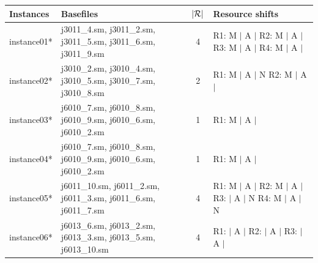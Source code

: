 \begin{table}[p]
    \centering
    \begin{tabularx}{0.95\textwidth}{lXcX}
        \toprule
        \textbf{Instances} & \textbf{Basefiles} & $|\mathcal{R}|$ & \textbf{Resource shifts} \\
        \midrule
        instance01* & j3011\_4.sm, j3011\_2.sm, j3011\_5.sm, j3011\_6.sm, j3011\_9.sm
                    & 4 
                    & R1: M $|$ A $|$  \newline
                      R2: M $|$ A $|$  \newline
                      R3: M $|$ A $|$  \newline
                      R4: M $|$ A $|$
                    \\
                    \cmidrule[0.01em](lr){1-4}
        instance02* & j3010\_2.sm, j3010\_4.sm, j3010\_5.sm, j3010\_7.sm, j3010\_8.sm
                    & 2 
                    & R1: M $|$ A $|$ N \newline
                      R2: M $|$ A $|$
                    \\
                    \cmidrule[0.01em](lr){1-4}
        instance03* & j6010\_7.sm, j6010\_8.sm, j6010\_9.sm, j6010\_6.sm, j6010\_2.sm 
                    & 1 
                    & R1: M $|$ A $|$ 
                    \\
                    \cmidrule[0.01em](lr){1-4}
        instance04* & j6010\_7.sm, j6010\_8.sm, j6010\_9.sm, j6010\_6.sm, j6010\_2.sm
                    & 1 
                    & R1: M $|$ A $|$
                    \\
                    \cmidrule[0.01em](lr){1-4}
        instance05* & j6011\_10.sm, j6011\_2.sm, j6011\_3.sm, j6011\_6.sm, j6011\_7.sm
                    & 4 
                    & R1: M $|$ A $|$ \newline
                      R2: M $|$ A $|$ \newline
                      R3: \phantom{M} $|$ A $|$ N \newline
                      R4: M $|$ A $|$ N
                    \\
                    \cmidrule[0.01em](lr){1-4}
        instance06* & j6013\_6.sm, j6013\_2.sm, j6013\_3.sm, j6013\_5.sm, j6013\_10.sm
                    & 4 
                    & R1: \phantom{M} $|$ A $|$ \newline
                      R2: \phantom{M} $|$ A $|$ \newline
                      R3: \phantom{M} $|$ A $|$ \newline

\end{tabularx}
\end{table}
